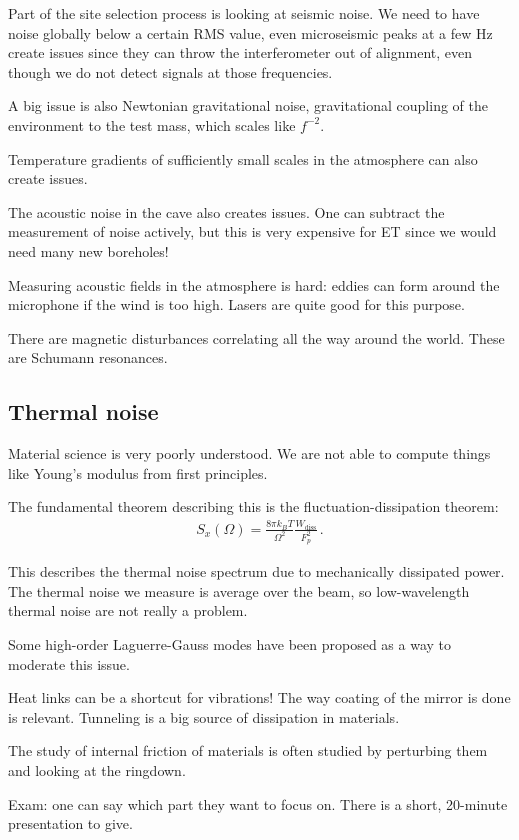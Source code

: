 \documentclass[main.tex]{subfiles}
\begin{document}
Part of the site selection process is looking at seismic noise. 
We need to have noise globally below a certain RMS value, 
even microseismic peaks at a few Hz create issues since they can throw 
the interferometer out of alignment, 
even though we do not detect signals at those frequencies. 

A big issue is also Newtonian gravitational noise, 
gravitational coupling of the environment to the test mass, which scales like \(f^{-2}\). 

Temperature gradients of sufficiently small scales in the atmosphere can also create issues. 

The acoustic noise in the cave also creates issues.
One can subtract the measurement of noise actively, but this is 
very expensive for ET since we would need many new boreholes! 

Measuring acoustic fields in the atmosphere is hard: eddies can form around the 
microphone if the wind is too high. 
Lasers are quite good for this purpose.

There are magnetic disturbances correlating all the way around the world. 
These are Schumann resonances. 

\subsection{Thermal noise}

Material science is very poorly understood.
We are not able to compute things like Young's modulus from first principles. 

The fundamental theorem describing this is the fluctuation-dissipation theorem: 
%
\begin{align}
S_x(\Omega ) = \frac{ 8 \pi k_B T}{\Omega^2} \frac{W _{\text{diss}}}{F_p^2}
\,.
\end{align}

This describes the thermal noise spectrum due to mechanically dissipated power. 
The thermal noise we measure is average over the beam, so low-wavelength 
thermal noise are not really a problem. 

Some high-order Laguerre-Gauss modes have been proposed as a way to moderate this issue.

Heat links can be a shortcut for vibrations! 
The way coating of the mirror is done is relevant. 
Tunneling is a big source of dissipation in materials. 

The study of internal friction of materials is often studied by 
perturbing them and looking at the ringdown. 

Exam: one can say which part they want to focus on.
There is a short, 20-minute presentation to give. 
\end{document}
